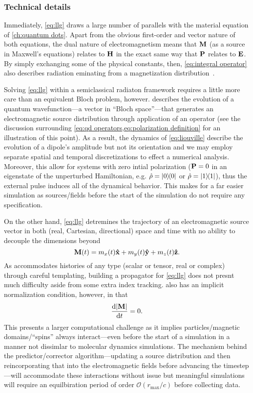 \subsubsection{Technical details}

Immediately, \cref{eq:llg} draws a large number of parallels with the material equation of  \cref{ch:quantum dots}.
Apart from the obvious first-order and vector nature of both equations, the dual nature of electromagnetism means that $\vb{M}$ (as a source in Maxwell's equations) relates to $\vb{H}$ in the exact same way that $\vb{P}$ relates to $\vb{E}$.
By simply exchanging some of the physical constants, then, \cref{eq:integral operator} also describes radiation eminating from a magnetization distribution~\cite{Rothwell2009}.

Solving \cref{eq:llg} within a semiclassical radiaton framework requires a little more care than an equivalent Bloch problem, however.
 describes the evolution of a quantum wavefunction---a vector in ``Bloch space''---that generates an electromagnetic source distribution through application of an operator (see the discussion surrounding \cref{eq:qd operators,eq:polarization definition} for an illustration of this point).
As a result, the dynamics of \cref{eq:liouville} describe the evolution of a dipole's amplitude but not its orientation and we may employ separate spatial and temporal discretizations to effect a numerical analysis.
Moreover, this allow for systems with zero intial polarization ($\vb{P} = 0$ in an eigenstate of the unperturbed Hamiltonian, e.g. $\hat{\rho} = \op{0}{0}$ or $\hat{\rho} = \op{1}{1}$), thus the external pulse induces all of the dynamical behavior.
This makes for a far easier simulation as sources/fields before the start of the simulation do not require any specification.

On the other hand, \cref{eq:llg} detremines the trajectory of an electromagnetic source vector in both (real, Cartesian, directional) space and time with no ability to decouple the dimensions beyond
\begin{equation}
  \vb{M}(t) = m_x(t) \vu{x} + m_y(t) \vu{y} + m_z(t) \vu{z}.
\end{equation}
As \QuEST{} accommodates histories of any type (scalar or tensor, real or complex) through careful templating, building a propagator for \cref{eq:llg} does not presnt much difficulty aside from some extra index tracking.
 also has an implicit normalization condition, however, in that
\begin{equation}
  \dv{\abs{\vb{M}}}{t} = 0.
\end{equation}
This presents a larger computational challenge as it implies particles/magnetic domains/``spins'' always interact---even before the start of a simulation in a manner not dissimlar to molecular dynamics simulations.
The mechanism behind the predictor/corrector algorithm---updating a source distribution and then reincorporating that into the electromagnetic fields before advancing the timestep---will accommodate these interactions without issue but meaningful simulations will require an equilbiration period of order $\mathcal{O}(r_\text{max}/c)$ before collecting data.
